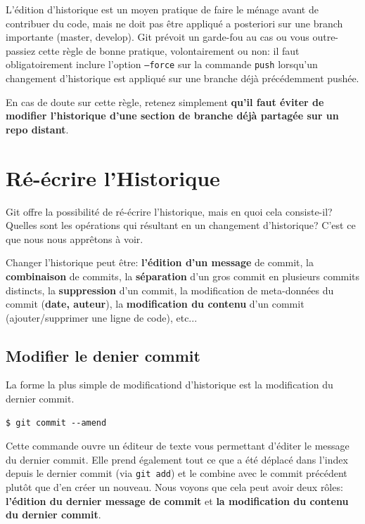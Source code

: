 \documentclass{../../common/tufte-latex/tufte-handout}
\begin{document}
L'édition d'historique est un moyen pratique de faire le ménage avant de contribuer du code, mais ne doit pas être appliqué a posteriori sur une branch importante (master, develop).  Git prévoit un garde-fou au cas ou vous outre-passiez cette règle de bonne pratique, volontairement ou non: il faut obligatoirement inclure l'option \texttt{--force} sur la commande \texttt{push} lorsqu'un changement d'historique est appliqué sur une branche déjà précédemment pushée.

En cas de doute sur cette règle, retenez simplement \textbf{qu'il faut éviter de modifier l'historique d'une section de branche déjà partagée sur un repo distant}.

\section{Ré-écrire l'Historique}
Git offre la possibilité de ré-écrire l'historique, mais en quoi cela consiste-il? Quelles sont les opérations qui résultant en un changement d'historique? C'est ce que nous nous apprêtons à voir.

Changer l'historique peut être: \textbf{l'édition d'un message} de commit, la \textbf{combinaison} de commits, la \textbf{séparation} d'un gros commit en plusieurs commits distincts, la \textbf{suppression} d'un commit, la modification de meta-données du commit (\textbf{date, auteur}), la \textbf{modification du contenu} d'un commit (ajouter/supprimer une ligne de code), etc...

\subsection{Modifier le denier commit}
La forme la plus simple de modificationd d'historique est la modification du dernier commit.

\begin{lstlisting}[style=BashInputStyle]
  $ git commit --amend
\end{lstlisting}

Cette commande ouvre un éditeur de texte vous permettant d'éditer le message du dernier commit.
Elle prend également tout ce que a été déplacé dans l'index depuis le dernier commit (via \texttt{git add}) et le combine avec le commit précédent plutôt que d'en créer un nouveau.
Nous voyons que cela peut avoir deux rôles: \textbf{l'édition du dernier message de commit} et \textbf{la modification du contenu du dernier commit}.
\end{document}
